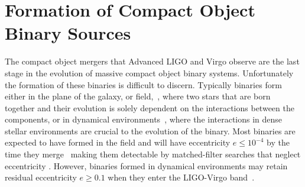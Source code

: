 \section{Formation of Compact Object Binary Sources}

The compact object mergers that Advanced LIGO and Virgo observe are the last stage in the evolution of massive compact object binary systems. Unfortunately the formation of these binaries is difficult to discern. Typically binaries form either in the plane of the galaxy, or field,~\cite{Smarr1976,Canal:1990dz,PortegiesZwart1:1997zn,Belczynski:2018ptv,Vigna-Gomez:2018dza,Giacobbo:2018etu,Mapelli:2018wys,Andrews:2019vou,Kalogera:2006uj,Kowalska:2010qg,Tauris:2017omb,Chruslinska:2017odi}, where two stars that are born together and their evolution is solely dependent on the interactions between the components, or in dynamical environments~\cite{Heggie:1975tg,Grindlay:2005ym,Ivanova:2007bu,Petrovich:2017otm,Sigurdsson:1993zrm,PortegiesZwart:1999nm,Oleary:2008myb,Antonini:2012ad, Rodriguez:2015,Rodriguez:2016,Rodriguez:2016big,Rodriguez:2018pss, Yu:2020iqj}, where the interactions in dense stellar environments are crucial to the evolution of the binary. Most binaries are expected to have formed in the field and will have eccentricity $e \leq 10^{-4}$ by the time they merge~\cite{Peters:1964zz,Hinder:2007qu,Kowalska:2010qg} making them detectable by matched-filter searches that neglect eccentricity \cite{Martel:1999tm,Cokelaer:2009hj,Brown:2009ng,Huerta:2013qb}. However, binaries formed in dynamical environments may retain residual eccentricity $e \geq 0.1$ when they enter the LIGO-Virgo band~\cite{Oleary:2008myb,Heggie:1975tg,Rodriguez:2015,Rodriguez:2016,Rodriguez:2016big,Rodriguez:2018pss,Yu:2020iqj}.   


